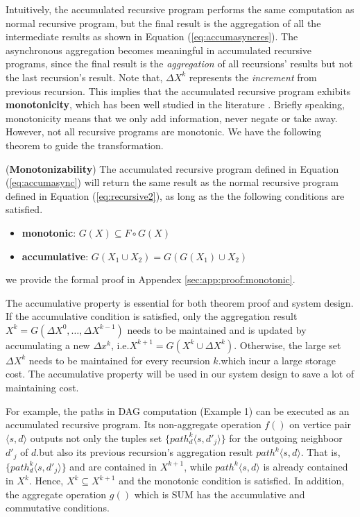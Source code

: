 Intuitively, the accumulated recursive program performs the same computation as normal recursive program, but the final result is the aggregation of all the intermediate results as shown in Equation (\ref{eq:accumasyncres}). The asynchronous aggregation becomes meaningful in accumulated recursive programs, since the final result is the \emph{aggregation} of all recursions' results but not the last recursion's result. Note that, $\Delta X^{k}$ represents the \emph{increment} from previous recursion. This implies that the accumulated recursive program exhibits \textbf{monotonicity}, which has been well studied in the literature \cite{Hellerstein:2010:DIE:1860702.1860704,calm,Lam:2013:SDE:2510649.2511289,Wang:2015:AFR:2824032.2824052}. Briefly speaking, monotonicity means that we only add information, never negate or take away. However, not all recursive programs are monotonic. We have the following theorem to guide the transformation.
\begin{theorem}
	\label{th:monotone}
	(\textbf{Monotonizability}) The accumulated recursive program defined in Equation (\ref{eq:accumasync}) will return the same result as the normal recursive program defined in Equation (\ref{eq:recursive2}), as long as the the following conditions are satisfied.
	\begin{itemize}
		\item \textbf{monotonic}: $G(X)\subseteq F\circ G(X)$
		\item \textbf{accumulative}: $G(X_1\cup X_2)=G(G(X_1)\cup X_2)$
	\end{itemize}
	
\end{theorem}
we provide the formal proof in Appendex \ref{sec:app:proof:monotonic}.

 The accumulative property is essential for both theorem proof and system design. If the accumulative condition is satisfied, only the aggregation result $X^k=G(\Delta X^{0},\ldots,\Delta X^{k-1})$ needs to be maintained and is updated by accumulating a new $\Delta x^{k}$, i.e.$X^{k+1}=G(X^k \cup \Delta X^k)$. Otherwise, the large set $\Delta X^{k}$ needs to be maintained for every recursion $k$.which incur a large storage cost. The accumulative property will be used in our system design to save a lot of maintaining cost.

For example, the paths in DAG computation (Example 1) can be executed as an accumulated recursive program. Its non-aggregate operation $f()$ on vertice pair$\langle s,d\rangle$ outputs not only the tuples set $\{path^k_d\langle s,d'_j\rangle\}$ for the outgoing neighboor $d'_j$ of $d$.but also its previous recursion's aggregation result $path^k\langle s,d\rangle$. That is, $\{path^k_d\langle s,d'_j\rangle\}$ and are contained in $X^{k+1}$, while  $path^k\langle s,d\rangle$ is already contained in $X^{k}$. Hence, $X^{k}\subseteq X^{k+1}$ and the monotonic condition is satisfied. In addition, the aggregate operation $g()$ which is SUM has the accumulative and commutative conditions.

